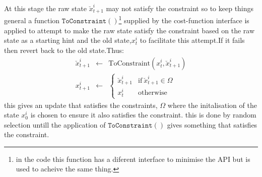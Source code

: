 \documentclass[a4paper,oneside,english]{article}
\numberwithin{equation}{section}
\numberwithin{figure}{section}
\begin{document}
At this stage the raw state $\breve{x}_{t+1}^i$ may not satisfy the constraint so to keep things general a function $\mathtt{ToConstraint()}$\footnote{in the code this function has a diferent interface to minimise the API but is used to acheive the same thing.} supplied by the cost-function interface is applied  to attempt to make the raw state  satisfy the constraint based on the raw state as a starting hint and the old state,$x_t^i$ to facilitate this attempt.If it fails then revert back to the old state.Thus: 
\begin{align}
\breve{x}_{t+1}^i&\leftarrow&\mathrm{ToConstraint}(x_t^i,\breve{x}_{t+1}^i)\\
x_{t+1}^i &\leftarrow& \left\lbrace
\begin{array}{cc}
\breve{x}_{t+1}^i& \mathrm{if}\: \breve{x}_{t+1}^i \in \Omega\\
x_t^i&\mathrm{otherwise}
\end{array}\right.
\end{align} 
this gives an update that satisfies the constraints, $\Omega$ where  the initalisation of the state $x_0^i$ is chosen to ensure it also satisfies the constraint. this is done by random selection untill the application of $\mathtt{ToConstraint()}$ gives something that satisfies the constraint.   
  	
	
	
	
\end{document}

